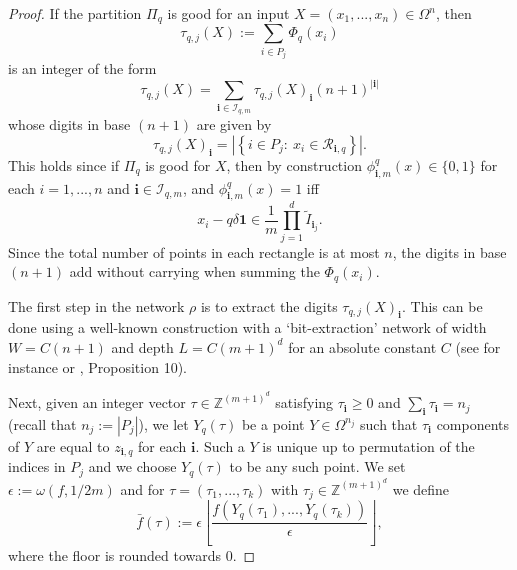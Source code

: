 \documentclass[twoside,11pt]{article}
\begin{document}
\begin{proof}
        If the partition $\Pi_q$ is good for an input $X = (x_1,...,x_n)\in \Omega^n$, then \begin{equation}\label{eqn:vector}
            \tau_{q,j}(X) := \sum_{i\in P_j} \Phi_{q}(x_i)
        \end{equation}
        is an integer of the form
        \begin{equation}
        \tau_{q,j}(X) = \sum_{\textbf{i}\in\mathcal{I}_{q,m}} \tau_{q,j}(X)_{\textbf{i}}(n+1)^{|\textbf{i}|}
        \end{equation}
        whose digits in base $(n+1)$ are given by
        \begin{equation}
            \tau_{q,j}(X)_\textbf{i} = \left|\left\{i\in P_j:~x_i\in \mathcal{R}_{\textbf{i},q}\right\}\right|.
        \end{equation} 
        This holds since if $\Pi_q$ is good for $X$, then by construction $\phi^q_{\textbf{i},m}(x)\in \{0,1\}$ for each $i=1,...,n$ and $\textbf{i}\in \mathcal{I}_{q,m}$, and $\phi^q_{\textbf{i},m}(x) = 1$ iff
        $$
            x_i - q\delta\textbf{1} \in \frac{1}{m}\prod_{j=1}^d \tilde{I}_{\textbf{i}_j}.
        $$
        Since the total number of points in each rectangle is at most $n$, the digits in base $(n+1)$ add without carrying when summing the $\Phi_q(x_i)$.

        The first step in the network $\rho$ is to extract the digits $\tau_{q,j}(X)_\textbf{i}$. This can be done using a well-known construction with a `bit-extraction' network of width $W = C(n+1)$ and depth $L = C(m+1)^d$ for an absolute constant $C$ (see for instance \cite{bartlett1998almost,yarotsky2018optimal} or \cite{siegel2023optimal}, Proposition 10).
        
        Next, given an integer vector $\tau\in \mathbb{Z}^{(m+1)^d}$ satisfying $\tau_{\textbf{i}} \geq 0$ and $\sum_{\textbf{i}} \tau_\textbf{i} = n_j$ (recall that $n_j := |P_j|$), we let $Y_q(\tau)$ be a point $Y\in \Omega^{n_j}$ such that $\tau_\textbf{i}$ components of $Y$ are equal to $z_{\textbf{i},q}$ for each $\textbf{i}$. Such a $Y$ is unique up to permutation of the indices in $P_j$ and we choose $Y_q(\tau)$ to be any such point. We set $\epsilon:=\omega(f,1/2m)$ and for $\tau = (\tau_1,...,\tau_k)$ with $\tau_j\in \mathbb{Z}^{(m+1)^d}$ we define
        \begin{equation}\label{bar-f-definition}
            \bar{f}(\tau) := \epsilon\left\lfloor \frac{f(Y_q(\tau_1),...,Y_q(\tau_k))}{\epsilon}\right\rfloor,
        \end{equation}
        where the floor is rounded towards $0$. 
        

\end{proof}
\end{document}
